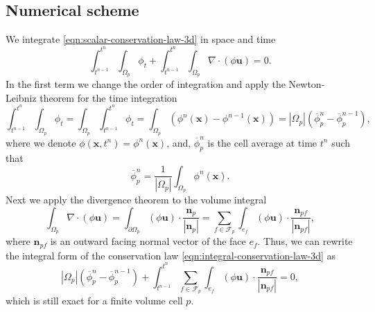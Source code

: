 \documentclass[../thesis.tex]{subfiles}
\begin{document}
\subsection{Numerical scheme}
We integrate \eqref{eqn:scalar-conservation-law-3d} in space and time
\begin{equation}\label{eqn:integral-conservation-law-3d}
	\int_{t^{n-1}}^{t^n} \int_{\Omega_p}
	\phi_t
	+\int_{t^{n-1}}^{t^n} \int_{\Omega_p}
	\nabla \cdot \left( \phi \mathbf{u}\right) = 0.
\end{equation}
In the first term we change the order of integration
and apply the Newton-Leibniz theorem for the time integration
\[
	\int_{t^{n-1}}^{t^n} \int_{\Omega_p}
	\phi_t =
	\int_{\Omega_p} \int_{t^{n-1}}^{t^n}
	\phi_t =
	\int_{\Omega_p}
	\left(\phi^n(\mathbf{x}) - \phi^{n-1}(\mathbf{x})\right)
	= |\Omega_p|(\overline{\phi}^{n}_p - \overline{\phi}_p^{n-1}),
\]
where we denote \(\phi(\mathbf{x}, t^n) = \phi^n(\mathbf{x})\),
and, \(\overline{\phi}_p^{n}\) is the cell average at time \(t^n\) such that
\begin{equation}\label{eqn:cell-avg-integral}
	\overline{\phi}^{n}_p
	= \frac{1}{|\Omega_p|}\int_{\Omega_p} \phi^{n}(\mathbf{x}).
\end{equation}
Next we apply
the divergence theorem to the volume integral
\[
	\int_{\Omega_p}
	\nabla \cdot \left(\phi\mathbf{u}\right) =
	\int_{\partial\Omega_p}
	\left( \phi\mathbf{u} \right) \cdot
	\frac{\mathbf{n}_p}{|\mathbf{n}_p|} =
	\sum_{f \in \mathcal{F}_p} \int_{e_f}
	\left( \phi\mathbf{u} \right)\cdot
	\frac{\mathbf{n}_{pf}}{|\mathbf{n}_{pf}|},
\]
where \(\mathbf{n}_{pf}\) is an outward facing normal vector of
the face \(e_f\).
Thus, we can rewrite the integral form of the conservation law
\eqref{eqn:integral-conservation-law-3d} as
\begin{equation}\label{eqn:integral-conservation-law-cell-3d}
	|\Omega_p|(\overline{\phi}_p^{n} - \overline{\phi}_p^{n-1})
	+ \int_{t^{n-1}}^{t^n} \sum_{f \in \mathcal{F}_p} \int_{e_f}
	\left( \phi\mathbf{u} \right)\cdot
	\frac{\mathbf{n}_{pf}}{|\mathbf{n}_{pf}|} = 0,
\end{equation}
which is still exact for a finite volume cell \(p\).
\end{document}
